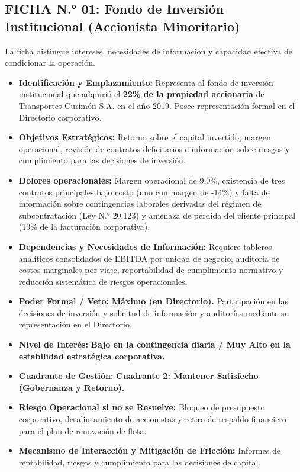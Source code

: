 \subsection*{FICHA N.° 01: Fondo de Inversión Institucional (Accionista Minoritario)}
La ficha distingue intereses, necesidades de información y capacidad efectiva de condicionar la operación.
\begin{itemize}
\item \textbf{Identificación y Emplazamiento:} Representa al fondo de inversión institucional que adquirió el \textbf{22\% de la propiedad accionaria} de Transportes Curimón S.A. en el año 2019. Posee representación formal en el Directorio corporativo.
\item \textbf{Objetivos Estratégicos:} Retorno sobre el capital invertido, margen operacional, revisión de contratos deficitarios e información sobre riesgos y cumplimiento para las decisiones de inversión.
\item \textbf{Dolores operacionales:} Margen operacional de 9,0\%, existencia de tres contratos principales bajo costo (uno con margen de -14\%) y falta de información sobre contingencias laborales derivadas del régimen de subcontratación (Ley N.° 20.123) y amenaza de pérdida del cliente principal (19\% de la facturación corporativa).
\item \textbf{Dependencias y Necesidades de Información:} Requiere tableros analíticos consolidados de EBITDA por unidad de negocio, auditoría de costos marginales por viaje, reportabilidad de cumplimiento normativo y reducción sistemática de riesgos operacionales.
\item \textbf{Poder Formal / Veto:} \textbf{Máximo (en Directorio).} Participación en las decisiones de inversión y solicitud de información y auditorías mediante su representación en el Directorio.
\item \textbf{Nivel de Interés:} \textbf{Bajo en la contingencia diaria / Muy Alto en la estabilidad estratégica corporativa.}
\item \textbf{Cuadrante de Gestión:} \textbf{Cuadrante 2: Mantener Satisfecho (Gobernanza y Retorno).}
\item \textbf{Riesgo Operacional si no se Resuelve:} Bloqueo de presupuesto corporativo, desalineamiento de accionistas y retiro de respaldo financiero para el plan de renovación de flota.
\item \textbf{Mecanismo de Interacción y Mitigación de Fricción:} Informes de rentabilidad, riesgos y cumplimiento para las decisiones de capital.
\end{itemize}
